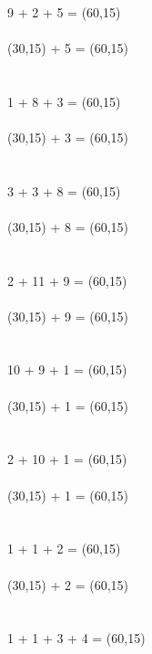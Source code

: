 \documentclass[12pt]{article}
\begin{document}
\\
9 + 2 + 5 = \framebox(60,15){}
\\
\\
\framebox(30,15){} + 5 = \framebox(60,15){}
\\
\\
\\
1 + 8 + 3 = \framebox(60,15){}
\\
\\
\framebox(30,15){} + 3 = \framebox(60,15){}
\\
\\
\\
3 + 3 + 8 = \framebox(60,15){}
\\
\\
\framebox(30,15){} + 8 = \framebox(60,15){}
\\
\\
\\
2 + 11 + 9 = \framebox(60,15){}
\\
\\
\framebox(30,15){} + 9 = \framebox(60,15){}
\\
\\
\\
10 + 9 + 1 = \framebox(60,15){}
\\
\\
\framebox(30,15){} + 1 = \framebox(60,15){}
\\
\\
\\
2 + 10 + 1 = \framebox(60,15){}
\\
\\
\framebox(30,15){} + 1 = \framebox(60,15){}
\\
\\
\\
1 + 1 + 2 = \framebox(60,15){}
\\
\\
\framebox(30,15){} + 2 = \framebox(60,15){}
\\
\\
\\
1 + 1 + 3 + 4 = \framebox(60,15){}
\end{document}
